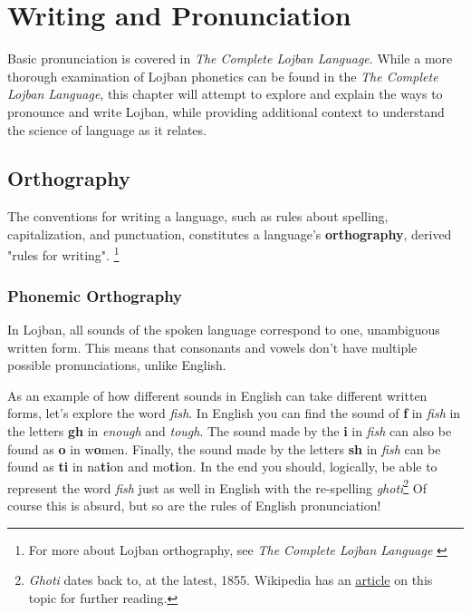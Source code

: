\documentclass[12pt]{book}
\begin{document}

\section{Writing and Pronunciation}

Basic pronunciation is covered in \emph{The Complete Lojban Language}. \cite[Chapter 2, p.~16]{CLL} While a more thorough examination of Lojban phonetics can be found in the \emph{The Complete Lojban Language}, \cite[Chapter 3, p.~34]{CLL} this chapter will attempt to explore and explain the ways to pronounce and write Lojban, while providing additional context to understand the science of language as it relates.

\subsection{Orthography}

The conventions for writing a language, such as rules about spelling, capitalization, and punctuation, constitutes a language's \textbf{orthography}, derived "rules for writing". \footnote{For more about Lojban orthography, see \emph{The Complete Lojban Language} \cite[Chapter 3, p.~33]{CLL} }

\subsubsection{Phonemic Orthography}


In Lojban, all sounds of the spoken language correspond to one, unambiguous written form. This means that consonants and vowels don't have multiple possible pronunciations, unlike English. 

As an example of how different sounds in English can take different written forms, let's explore the word \emph{fish}. In English you can find the sound of \textbf{f} in \emph{fish} in the letters \textbf{gh} in \emph{enough} and \emph{tough}. The sound made by the \textbf{i} in \emph{fish} can also be found as \textbf{o} in w\textbf{o}men. Finally, the sound made by the letters \textbf{sh} in \emph{fish} can be found as \textbf{ti} in na\textbf{ti}on and mo\textbf{ti}on. In the end you should, logically, be able to represent the word \emph{fish} just as well in English with the re-spelling \emph{ghoti}\footnote{\emph{Ghoti} dates back to, at the latest, 1855. Wikipedia has an \href{https://en.wikipedia.org/wiki/Ghoti}{article} on this topic for further reading.} Of course this is absurd, but so are the rules of English pronunciation!
\end{document}
